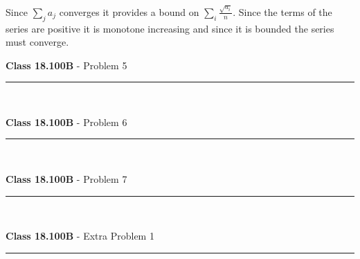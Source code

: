 \documentclass[11pt,reqno]{article}
\begin{document}
\noindent Since $\sum_j a_j$ converges it provides a bound on $\sum_i \frac{\sqrt{a_i}}{n}$. Since the terms of the series are positive it is monotone increasing and since it is bounded the series must converge.

\vspace{15pt}
\begin{flushleft} 
\textbf{Class 18.100B} - Problem 5\\
\rule{500pt}{1pt}\\
\end{flushleft} 


\vspace{15pt}
\begin{flushleft} 
\textbf{Class 18.100B} - Problem 6\\
\rule{500pt}{1pt}\\
\end{flushleft} 


\vspace{15pt}
\begin{flushleft} 
\textbf{Class 18.100B} - Problem 7\\
\rule{500pt}{1pt}\\
\end{flushleft} 


\indent 
\vspace{15pt}
\begin{flushleft} 
\textbf{Class 18.100B} - Extra Problem 1\\
\rule{500pt}{1pt}\\
\end{flushleft} 
\end{document}
